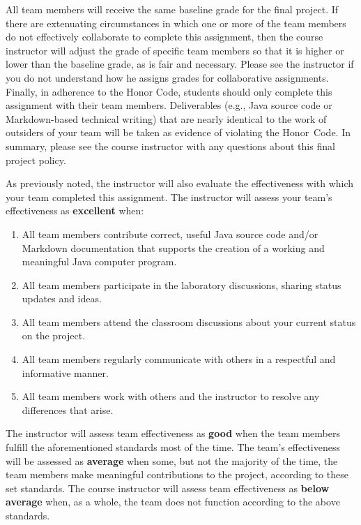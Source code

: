 \documentclass[11pt]{article}
\begin{document}
All team members will receive the same baseline grade for the final project. If there are extenuating circumstances in
which one or more of the team members do not effectively collaborate to complete this assignment, then the course
instructor will adjust the grade of specific team members so that it is higher or lower than the baseline grade, as is
fair and necessary. Please see the instructor if you do not understand how he assigns grades for collaborative
assignments. Finally, in adherence to the Honor Code, students should only complete this assignment with their team
members. Deliverables (e.g., Java source code or Markdown-based technical writing) that are nearly identical to the work
of outsiders of your team will be taken as evidence of violating the \mbox{Honor Code}. In summary, please see the
course instructor with any questions about this final project policy.

As previously noted, the instructor will also evaluate the effectiveness with which your team completed this assignment.
The instructor will assess your team's effectiveness as {\bf excellent} when:

\vspace*{-.5em}

\begin{enumerate}
  \setlength{\itemsep}{0pt}

\item All team members contribute correct, useful Java source code and/or Markdown documentation that supports the
  creation of a working and meaningful Java computer program.

\item All team members participate in the laboratory discussions, sharing status updates and ideas.

\item All team members attend the classroom discussions about your current status on the project.

\item All team members regularly communicate with others in a respectful and informative manner.

\item All team members work with others and the instructor to resolve any differences that arise.

\end{enumerate}

\vspace*{-.5em}

The instructor will assess team effectiveness as {\bf good} when the team
members fulfill the aforementioned standards most of the time. The team's
effectiveness will be assessed as {\bf average} when some, but not the majority
of the time, the team members make meaningful contributions to the project,
according to these set standards. The course instructor will assess team
effectiveness as {\bf below average} when, as a whole, the team does not
function according to the above standards.
\end{document}
